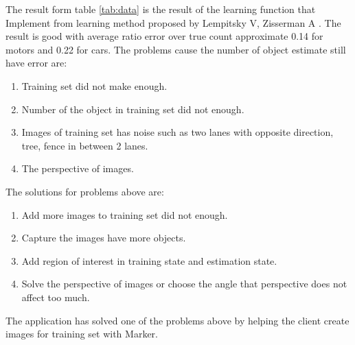 The result form table \ref{tab:data} is the result of the learning function that Implement from learning method proposed by
Lempitsky V, Zisserman A \cite{Lempitsky:Zisserman:Destimate}. The result is good with average ratio error over true count approximate 0.14 for motors and 0.22 for cars. The problems cause the number of object estimate still have error are:
  \begin{enumerate}
    \item Training set did not make enough.
    \item Number of the object in training set did not enough.
    \item Images of training set has noise such as two lanes with opposite direction, tree, fence in between 2 lanes.
    \item The perspective of images.
  \end{enumerate}
  The solutions for problems above are: 
  \begin{enumerate}
    \item Add more images to training set did not enough.
    \item Capture the images have more objects.
    \item Add region of interest in training state and estimation state. 
    \item Solve the perspective of images or choose the angle that perspective does not affect too much. 
  \end{enumerate}
  The application has solved one of the problems above by helping the client create images for training set with Marker.\\
  



